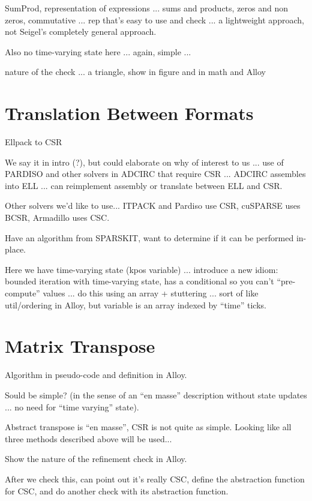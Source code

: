 \documentclass{article}
\begin{document}
SumProd, representation of expressions ... sums and products, zeros
and non zeros, commutative ... rep that's easy to use and check ... a
lightweight approach, not Seigel's completely general approach.

Also no time-varying state here ... again, simple ...

nature of the check ... a triangle, show in figure and in math and Alloy


\section{Translation Between Formats}

Ellpack to CSR

We say it in intro (?), but could elaborate on why of interest to us
... use of PARDISO and other solvers in ADCIRC that require CSR
... ADCIRC assembles into ELL ... can reimplement assembly or
translate between ELL and CSR.

\cbstart
Other solvers we'd like to use... ITPACK and Pardiso use CSR, cuSPARSE uses BCSR, Armadillo uses CSC.

Have an algorithm from SPARSKIT, want to determine if it can be performed in-place.
\cbend

Here we have time-varying state (kpos variable) ... introduce a new
idiom: bounded iteration with time-varying state, has a conditional so
you can't ``pre-compute'' values ... do this using an array + stuttering
... sort of like util/ordering in Alloy, but variable is an array
indexed by ``time'' ticks.

\section{Matrix Transpose}

Algorithm in pseudo-code and definition in Alloy.

Sould be simple? (in the sense of an ``en masse'' description without
state updates ... no need for ``time varying'' state).

\cbstart
Abstract transpose is ``en masse'', CSR is not quite as simple. Looking like all three methods described above will be used...
\cbend

Show the nature of the refinement check in Alloy.

After we check this, can point out it's really CSC, define the
abstraction function for CSC, and do another check with its
abstraction function.
\end{document}
